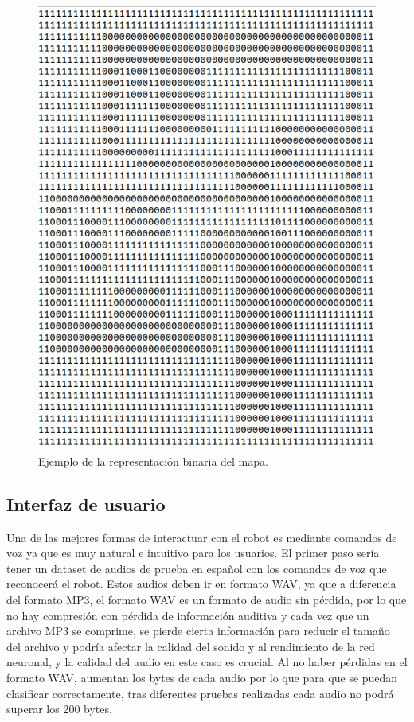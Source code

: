 \begin{figure}[H]
  \centering
  \includegraphics[scale=0.5]{figs/bin} %
  \caption{ Ejemplo de la representación binaria del mapa.}
  \label{fig:bin}
\end{figure}


\subsection{Interfaz de usuario}
\label{subsec:interfaz_usuario}

Una de las mejores formas de interactuar con el robot es mediante comandos de voz ya que es muy natural e intuitivo para los usuarios. El primer paso sería tener un dataset de audios de prueba en español con los comandos de voz que reconocerá el robot. Estos audios deben ir en formato WAV, ya que a diferencia del formato MP3, el formato WAV es un formato de audio sin pérdida, por lo que no hay compresión con pérdida de información auditiva y cada vez que un archivo MP3 se comprime, se pierde cierta información para reducir el tamaño del archivo y podría afectar la calidad del sonido y al rendimiento de la red neuronal, y la calidad del audio en este caso es crucial. Al no haber pérdidas en el formato WAV, aumentan los bytes de cada audio por lo que para que se puedan clasificar correctamente, tras diferentes pruebas realizadas cada audio no podrá superar los 200 bytes.\\


